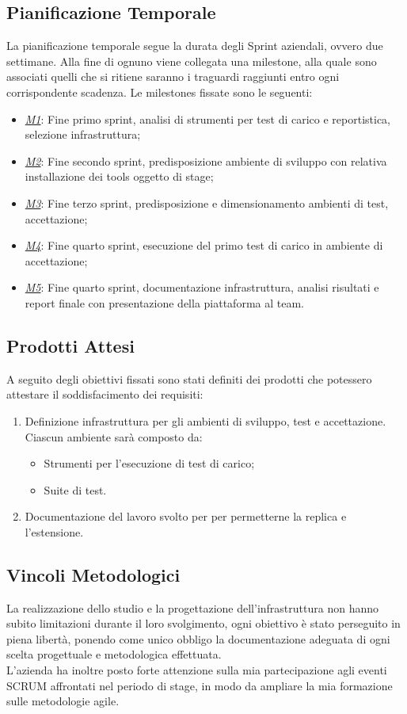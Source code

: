 \subsection{Pianificazione Temporale}
\label{subsec:pianificazione}
La pianificazione temporale segue la durata degli Sprint aziendali, ovvero due settimane. Alla fine di ognuno viene collegata una \gls{milestone}, alla quale sono associati quelli che si ritiene saranno i traguardi raggiunti entro ogni corrispondente scadenza.
Le milestones fissate sono le seguenti:
\begin{itemize}
	\item \underline{\textit{M1}}: Fine primo sprint, analisi di strumenti per test di carico e reportistica, selezione infrastruttura;
	\item \underline{\textit{M2}}: Fine secondo sprint, predisposizione ambiente di sviluppo con relativa installazione dei tools oggetto di stage;
	\item \underline{\textit{M3}}: Fine terzo sprint, predisposizione e dimensionamento ambienti di test, accettazione;
	\item \underline{\textit{M4}}: Fine quarto sprint, esecuzione del primo test di carico in ambiente di accettazione;
	\item \underline{\textit{M5}}: Fine quarto sprint, documentazione infrastruttura, analisi risultati e report finale con presentazione della piattaforma al team.
\end{itemize}
\subsection{Prodotti Attesi}
A seguito degli obiettivi fissati sono stati definiti dei prodotti che potessero attestare il soddisfacimento dei requisiti:
\begin{enumerate}
	\item Definizione infrastruttura per gli ambienti di sviluppo, test e accettazione.\\ 
	Ciascun ambiente sarà composto da:
	\begin{itemize}
		\item Strumenti per l'esecuzione di test di carico;
		\item Suite di test.
	\end{itemize}
	\item Documentazione del lavoro svolto per per permetterne la replica e l'estensione.
\end{enumerate}

\subsection{Vincoli Metodologici}
La realizzazione dello studio e la progettazione dell'infrastruttura non hanno subito limitazioni durante il loro svolgimento, ogni obiettivo è stato perseguito in piena libertà, ponendo come unico obbligo la documentazione adeguata di ogni scelta progettuale e metodologica effettuata. \\
L'azienda ha inoltre posto forte attenzione sulla mia partecipazione agli eventi SCRUM affrontati nel periodo di stage, in modo da ampliare la mia formazione sulle metodologie \gls{agile}.
